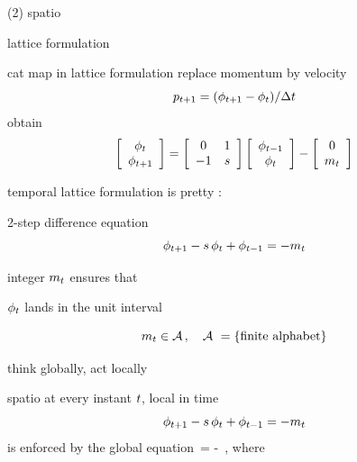 \begin{frame}{(2) {\color{orange}spatio}{\templatt}}
\vfill
\begin{center}
{\huge lattice formulation}
\end{center}
\vfill
\end{frame} %

\begin{frame}{cat map in lattice formulation}
replace momentum by velocity
\[
p_{t+1}=(\phi_{t+1}  - \phi_{t})/\Delta t
\]
obtain
 \[
 \left[\begin{array}{c}
   \phi_{t}  \\
   \phi_{t+1}
  \end{array} \right]=
  \left[
\begin{array}{cc}
0 & 1 \\
-1 & s \\
\end{array}
    \right]
    \left[\begin{array}{c}
   \phi_{t-1}  \\
   \phi_{t}
  \end{array} \right]
 - \left[\begin{array}{c}
 0  \\
 {m_{t}}
 \end{array} \right]
 \] %

temporal lattice formulation %
is {\Large pretty} :
\begin{block}{2-step difference equation}
\[
\phi_{t+1}  -  s \, \phi_{t} + \phi_{t-1}
    =
-{m_{t}}
\] %
\end{block}
integer ${m_{t}}$ ensures that

\hfill $\phi_{t}$ lands in the unit interval

\bigskip
\[
{m_{t}}\in  \mathcal{A}
\,,\quad \mathcal{A}\ = \{\mbox{finite alphabet}\}
\]
\end{frame} %

\begin{frame}{think globally, act locally}

{\color{orange}spatio}{\templatt} at every instant $t$, {\color{blue}local} in time
\[
\phi_{t+1}  -  s \, \phi_{t} + \phi_{t-1}
    =
-{m_{t}}
\] %
is enforced by the {\color{blue}global} equation
\beq
 \jMorb\,\Xx = -\Mm
\,,
where
\end{frame} %

